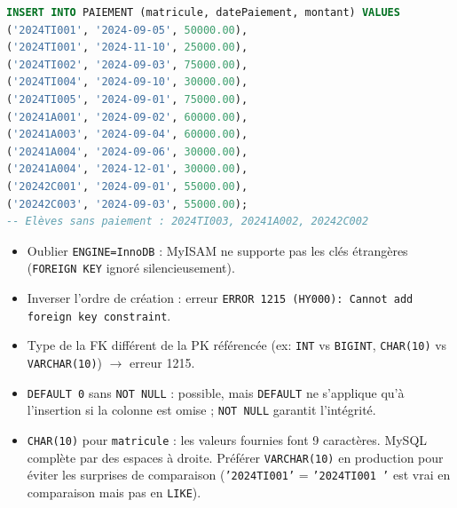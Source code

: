 \documentclass[11pt]{article}
\begin{document}
\begin{exoresolu}
\begin{lstlisting}[language=SQL, caption={Insertion des 11 paiements (idPaiement auto)}]
INSERT INTO PAIEMENT (matricule, datePaiement, montant) VALUES
('2024TI001', '2024-09-05', 50000.00),
('2024TI001', '2024-11-10', 25000.00),
('2024TI002', '2024-09-03', 75000.00),
('2024TI004', '2024-09-10', 30000.00),
('2024TI005', '2024-09-01', 75000.00),
('20241A001', '2024-09-02', 60000.00),
('20241A003', '2024-09-04', 60000.00),
('20241A004', '2024-09-06', 30000.00),
('20241A004', '2024-12-01', 30000.00),
('20242C001', '2024-09-01', 55000.00),
('20242C003', '2024-09-03', 55000.00);
-- Elèves sans paiement : 2024TI003, 20241A002, 20242C002
\end{lstlisting}
\end{exoresolu}

\begin{attention}
\begin{itemize}
    \item Oublier \texttt{ENGINE=InnoDB} : MyISAM ne supporte pas les clés étrangères (\texttt{FOREIGN KEY} ignoré silencieusement).
    \item Inverser l'ordre de création : erreur \texttt{ERROR 1215 (HY000): Cannot add foreign key constraint}.
    \item Type de la FK différent de la PK référencée (ex: \texttt{INT} vs \texttt{BIGINT}, \texttt{CHAR(10)} vs \texttt{VARCHAR(10)}) $\to$ erreur 1215.
    \item \texttt{DEFAULT 0} sans \texttt{NOT NULL} : possible, mais \texttt{DEFAULT} ne s'applique qu'à l'insertion si la colonne est omise ; \texttt{NOT NULL} garantit l'intégrité.
    \item \texttt{CHAR(10)} pour \texttt{matricule} : les valeurs fournies font 9 caractères. MySQL complète par des espaces à droite. Préférer \texttt{VARCHAR(10)} en production pour éviter les surprises de comparaison (\texttt{'2024TI001'} = \texttt{'2024TI001 '} est vrai en comparaison mais pas en \texttt{LIKE}).
\end{itemize}
\end{attention}
\end{document}
